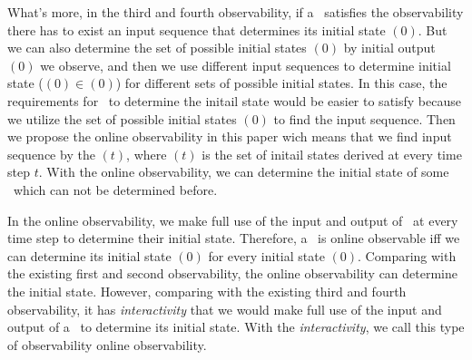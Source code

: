 What's more, in the third and fourth observability, if a \BCN\ satisfies the observability there has to exist an input sequence that determines its initial state \State$(0)$. But we can also determine the set of possible initial states \Ustate$(0)$ by initial output \Output$(0)$ we observe, and then we use different input sequences to determine initial state (\State$(0)$$\in$\Ustate$(0)$) for different sets of possible initial states. In this case, the requirements for \BCNs\ to determine the initail state would be easier to satisfy because we utilize the set of possible initial states \Ustate$(0)$ to find the input sequence. Then we propose the online observability in this paper wich means that we find input sequence by the \Ustate$(t)$, where \Ustate$(t)$ is the set of initail states derived at every time step $t$. With the online observability, we can determine the initial state of some \BCNs\ which can not be determined before.


In the online observability, we make full use of the input and output of \BCNs\ at every time step to determine their initial state. Therefore, a \BCN\ is online observable iff we can determine its initial state \State$(0)$ for every initial state \State$(0)$. Comparing with the existing first and second observability, the online observability can determine the initial state. However, comparing with the existing third and fourth observability, it has {\em interactivity} that we would make full use of the input and output of a \BCN\ to determine its initial state. With the {\em interactivity}, we call this type of observability online observability. %

